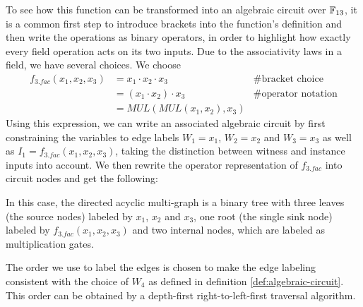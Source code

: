 \begin{example}
To see how this function can be transformed into an algebraic circuit over $\mathbb{F}_{13}$, it is a common first step to introduce brackets into the function's definition and then write the operations as binary operators, in order to highlight how exactly every field operation acts on its two inputs. Due to the associativity laws in a field, we have several choices. We choose
\begin{align*}
f_{3.fac}(x_1,x_2,x_3) & = x_1\cdot x_2 \cdot x_3  & \text{\# bracket choice} \\
                       & = (x_1\cdot x_2 ) \cdot x_3  & \text{\# operator notation} \\
                       & = MUL(MUL(x_1,x_2),x_3)
\end{align*}
Using this expression, we can write an associated algebraic circuit by first constraining the variables to edge labels $W_1=x_1$, $W_2=x_2$ and $W_3=x_3$ as well as $I_1=f_{3.fac}(x_1,x_2,x_3)$, taking the distinction between witness and instance inputs into account. We then rewrite the operator representation of $f_{3.fac}$ into circuit nodes and get the following: 
\begin{center}
\end{center}


In this case, the directed acyclic multi-graph is a binary tree with three leaves (the source nodes) labeled by $x_1$, $x_2$ and $x_3$, one root (the single sink node) labeled by $f_{3.fac}(x_1,x_2,x_3)$ and two internal nodes, which are labeled as multiplication gates. 

The order we use to label the edges is chosen to make the edge labeling consistent with the choice of $W_4$ as defined in definition \ref{def:algebraic-circuit}. This order can be obtained by a depth-first right-to-left-first traversal algorithm.
\end{example}
